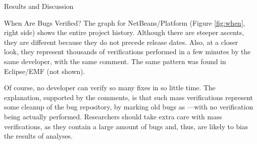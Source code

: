 \begin{section}{Results and Discussion}
\begin{subsection}{When Are Bugs Verified?}
	The graph for NetBeans/Platform (Figure \ref{fig:when}, right side) shows the entire project history. Although there are steeper ascents, they are different because they do not precede release dates. Also, at a closer look, they represent thousands of verifications performed in a few minutes by the same developer, with the same comment. The same pattern was found in Eclipse/EMF (not shown).
	
	Of course, no developer can verify so many fixes in so little time. The explanation, supported by the comments, is that such mass verifications represent some cleanup of the bug repository, by marking old bugs as \VERIFIED---with no verification being actually performed. Researchers should take extra care with mass verifications, as they contain a large amount of bugs and, thus, are likely to bias the results of analyses.
	
	
	
	
	
	

\end{subsection}
\end{section}
